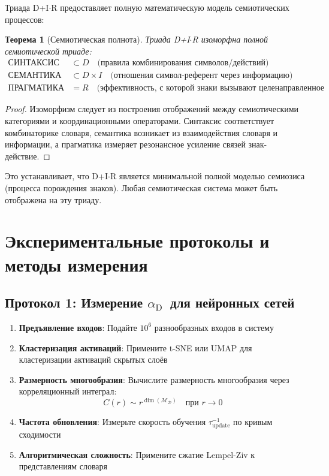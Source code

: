 \documentclass[12pt,a4paper]{article}
\newtheorem{theorem}{Теорема}
\DeclareMathOperator{\dimension}{dim}
\DeclareRobustCommand{\alD}{\texorpdfstring{\ensuremath{\alpha_{\mathrm{D}}}}{alpha_D}}
\newcommand{\Dict}{\mathcal{D}}
\newcommand{\Mdict}{\mathcal{M}_{\Dict}}
\begin{document}
	Триада D+I\(\cdot\)R предоставляет полную математическую модель семиотических процессов:
	
	\begin{theorem}[Семиотическая полнота]
		Триада D+I\(\cdot\)R изоморфна полной семиотической триаде:
		\begin{align*}
			\text{СИНТАКСИС} &\subset D \quad \text{(правила комбинирования символов/действий)} \\
			\text{СЕМАНТИКА} &\subset D \times I \quad \text{(отношения символ-референт через информацию)} \\
			\text{ПРАГМАТИКА} &= R \quad \text{(эффективность, с которой знаки вызывают целенаправленное действие)}
		\end{align*}
	\end{theorem}
	
	\begin{proof}
		Изоморфизм следует из построения отображений между семиотическими категориями и координационными операторами. Синтаксис соответствует комбинаторике словаря, семантика возникает из взаимодействия словаря и информации, а прагматика измеряет резонансное усиление связей знак-действие.
	\end{proof}
	
	Это устанавливает, что D+I\(\cdot\)R является минимальной полной моделью семиозиса (процесса порождения знаков). Любая семиотическая система может быть отображена на эту триаду.
	
	\section{Экспериментальные протоколы и методы измерения}
	
	\subsection{Протокол 1: Измерение \alD\ для нейронных сетей}
	\label{subsec:protocol-alpha}
	
	\begin{enumerate}
		\item \textbf{Предъявление входов}: Подайте \(10^6\) разнообразных входов в систему
		\item \textbf{Кластеризация активаций}: Примените t-SNE или UMAP для кластеризации активаций скрытых слоёв
		\item \textbf{Размерность многообразия}: Вычислите размерность многообразия через корреляционный интеграл:
		\[
		C(r) \sim r^{\dimension(\Mdict)} \quad \text{при } r \to 0
		\]
		\item \textbf{Частота обновления}: Измерьте скорость обучения \(\tau_{\mathrm{update}}^{-1}\) по кривым сходимости
		\item \textbf{Алгоритмическая сложность}: Примените сжатие Lempel-Ziv к представлениям словаря
	\end{enumerate}
	
\end{document}
